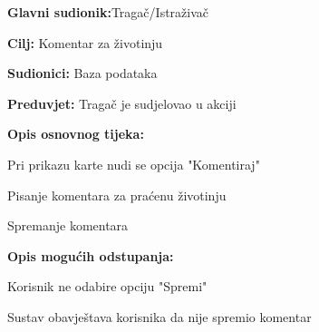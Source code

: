 				\noindent {}
				\begin{packed_item}
					
					\item \textbf{Glavni sudionik:}Tragač/Istraživač
					\item  \textbf{Cilj:} Komentar za životinju 
					\item  \textbf{Sudionici:} Baza podataka
					\item  \textbf{Preduvjet:} Tragač je sudjelovao u akciji
					\item  \textbf{Opis osnovnog tijeka:}
					
					\item[] \begin{packed_enum}
					 
						\item Pri prikazu karte	nudi se opcija "Komentiraj"
					\item Pisanje komentara za praćenu životinju
						\item  Spremanje komentara
					\end{packed_enum}
					
						\item  \textbf{Opis mogućih odstupanja:}
					
					\item[] \begin{packed_item}
						
						\item[4.a]Korisnik ne odabire opciju "Spremi"
						\item[] \begin{packed_enum}
							
							\item Sustav obavještava korisnika da nije spremio komentar
							
						\end{packed_enum}
						
					\end{packed_item}
					
				\end{packed_item}
				
				
				
